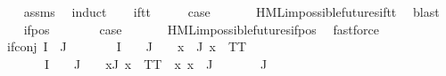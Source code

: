 \begin{isabellebody}
%
\isadelimproof
\ \ %
\endisadelimproof
%
\isatagproof
{}\isamarkupfalse%
\ assms\ \isamarkupfalse%
\ induct\isanewline
\ \ \isamarkupfalse%
\ if{\isacharunderscore}{\kern0pt}tt\isanewline
\ \ \isamarkupfalse%
\ \isamarkupfalse%
\ {\isacharquery}{\kern0pt}case\ \isanewline
\ \ \ \ \isamarkupfalse%
\ HML{\isacharunderscore}{\kern0pt}impossible{\isacharunderscore}{\kern0pt}futures{\isachardot}{\kern0pt}if{\isacharunderscore}{\kern0pt}tt\ \isamarkupfalse%
\ blast\isanewline
{}\isamarkupfalse%
\isanewline
\ \ \isamarkupfalse%
\ {\isacharparenleft}{\kern0pt}if{\isacharunderscore}{\kern0pt}pos\ {\isasymphi}\ {\isasymalpha}{\isacharparenright}{\kern0pt}\isanewline
\ \ \isamarkupfalse%
\ \isamarkupfalse%
\ {\isacharquery}{\kern0pt}case\ \isanewline
\ \ \ \ \isamarkupfalse%
\ HML{\isacharunderscore}{\kern0pt}impossible{\isacharunderscore}{\kern0pt}futures{\isachardot}{\kern0pt}if{\isacharunderscore}{\kern0pt}pos\ \isamarkupfalse%
\ fastforce\isanewline
{}\isamarkupfalse%
\isanewline
\ \ \isamarkupfalse%
\ {\isacharparenleft}{\kern0pt}if{\isacharunderscore}{\kern0pt}conj\ I\ {\isasymPhi}\ J{\isacharparenright}{\kern0pt}\isanewline
\ \ \isamarkupfalse%
\ \isamarkupfalse%
\ {\isachardoublequoteopen}{\isasymPhi}\ {\isacharbackquote}{\kern0pt}\ I\ {\isasyminter}\ {\isasymPhi}\ {\isacharbackquote}{\kern0pt}\ J\ {\isasymnoteq}\ {\isacharbraceleft}{\kern0pt}{\isacharbraceright}{\kern0pt}\ {\isasymor}\ {\isacharparenleft}{\kern0pt}{\isasymexists}x{\isasymin}{\isasymPhi}\ {\isacharbackquote}{\kern0pt}\ J{\isachardot}{\kern0pt}\ x\ {\isacharequal}{\kern0pt}\ TT{\isacharparenright}{\kern0pt}{\isachardoublequoteclose}\isanewline
\ \ \ \ {\isacharbar}{\kern0pt}\ {\isachardoublequoteopen}{\isasymPhi}\ {\isacharbackquote}{\kern0pt}\ I\ {\isasyminter}\ {\isasymPhi}\ {\isacharbackquote}{\kern0pt}\ J\ {\isacharequal}{\kern0pt}\ {\isacharbraceleft}{\kern0pt}{\isacharbraceright}{\kern0pt}\ {\isasymand}\ {\isacharparenleft}{\kern0pt}{\isasymforall}x{\isasymin}{\isasymPhi}{\isacharbackquote}{\kern0pt}J{\isachardot}{\kern0pt}\ x\ {\isasymnoteq}\ TT{\isacharparenright}{\kern0pt}\ {\isasymand}\ {\isacharparenleft}{\kern0pt}{\isasymexists}x{\isachardot}{\kern0pt}\ x\ {\isasymin}\ {\isasymPhi}{\isacharbackquote}{\kern0pt}J{\isacharparenright}{\kern0pt}{\isachardoublequoteclose}\isanewline
\ \ \ \ {\isacharbar}{\kern0pt}\ {\isachardoublequoteopen}{\isasymPhi}\ {\isacharbackquote}{\kern0pt}\ J\ {\isacharequal}{\kern0pt}\ {\isacharbraceleft}{\kern0pt}{\isacharbraceright}{\kern0pt}{\isachardoublequoteclose}\isanewline

\end{isabellebody}
